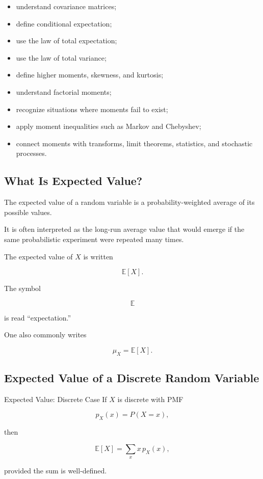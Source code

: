 {\begin{itemize}
    \item understand covariance matrices;
    \item define conditional expectation;
    \item use the law of total expectation;
    \item use the law of total variance;
    \item define higher moments, skewness, and kurtosis;
    \item understand factorial moments;
    \item recognize situations where moments fail to exist;
    \item apply moment inequalities such as Markov and Chebyshev;
    \item connect moments with transforms, limit theorems, statistics,
          and stochastic processes.
\end{itemize}
}

\subsection{What Is Expected Value?}
\label{subsec:what-is-expected-value}

The expected value of a random variable is a probability-weighted
average of its possible values.

It is often interpreted as the long-run average value that would emerge
if the same probabilistic experiment were repeated many times.

The expected value of \(X\) is written

\[
\boxed{
\mathbb{E}[X].
}
\]

The symbol

\[
\mathbb{E}
\]

is read ``expectation.''

One also commonly writes

\[
\boxed{
\mu_X
=
\mathbb{E}[X].
}
\]

\subsection{Expected Value of a Discrete Random Variable}
\label{subsec:discrete-expectation}

\begin{definitionbox}{Expected Value: Discrete Case}
If \(X\) is discrete with PMF

\[
p_X(x)=P(X=x),
\]

then

\[
\boxed{
\mathbb{E}[X]
=
\sum_x
x\,p_X(x),
}
\]

provided the sum is well-defined.
\end{definitionbox}

